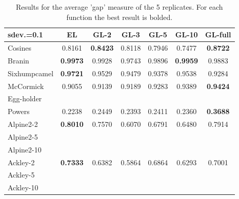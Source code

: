 \documentclass[twoside]{article}
\begin{document}
\begin{table}[t!]
\begin{center}
\begin{tabular}{lcccccc}
\toprule
     sdev.=0.1 &        EL &      GL-2 &      GL-3 &      GL-5 &     GL-10 & GL-full \\
\midrule
      Cosines & 0.8161 &  \textbf{0.8423} &  0.8118 &  0.7946 &  0.7477 &  \textbf{0.8722}\\
       Branin & \textbf{0.9973} &  0.9928 &  0.9743 &  0.9896 &  \textbf{0.9959} &  0.9883\\
 Sixhumpcamel & \textbf{0.9721} &  0.9529 &  0.9479 &  0.9378 &  0.9538 &  0.9284\\
    McCormick & 0.9055 &  0.9139 &  0.9189 &  0.9283 &  0.9389 &  \textbf{0.9424}\\
       Egg-holder & &&&&&\\   
       Powers   & 0.2238 &  0.2449 &  0.2393 &  0.2411 &  0.2360 &  \textbf{0.3688}\\
       Alpine2-2 & \textbf{0.8010} &  0.7570 &  0.6070 &  0.6791 &  0.6480 &  0.7914 \\
       Alpine2-5 &&&&&\\
       Alpine2-10 &&&&&\\
       Ackley-2 & \textbf{0.7333} &  0.6382 &  0.5864 &  0.6864 &  0.6293 &  0.7001 \\
       Ackley-5 &&&&&\\
       Ackley-10 &&&&&\\
\bottomrule
\end{tabular}\caption{Results for the average 'gap' measure of the 5 replicates. For each function the best result is bolded. }
\end{center}\label{table:comparision}
\end{table}

\end{document}
